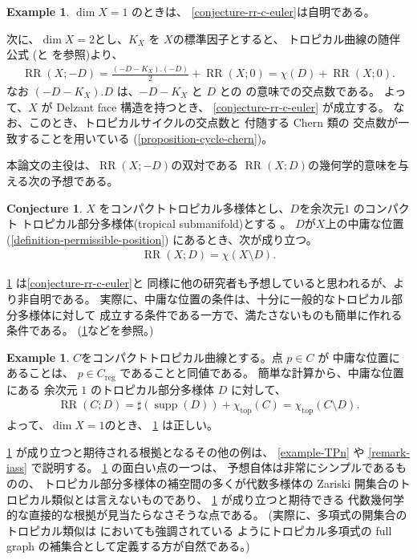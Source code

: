 \documentclass[a4paper,dvipdfmx,reqno,12pt]{amsart}
\theoremstyle{definition}
\newtheorem{example}[theorem]{Example}
\newtheorem{conjecture}[theorem]{Conjecture}
\newcommand{\opn}[1]{\operatorname{#1}}
\numberwithin{equation}{section}
\begin{document}
\begin{example}
$\dim X=1$ のときは、
\cref{conjecture-rr-c-euler}は自明である。

次に、$\dim X=2$とし、$K_X$ を
$X$の標準因子とすると、
トロピカル曲線の随伴公式
(\cite[Theorem 6]{shaw2015tropical}と
\cite[Theorem 5.2]{demedrano2023chern}を参照)より、
\begin{align}
\opn{RR}(X;-D)=\frac{(-D-K_X).(-D)}{2}+\opn{RR}(X;0)
=\chi(D)+\opn{RR}(X;0).
\end{align}
なお $(-D-K_X). D$ は、$-D-K_X$ と
$D$ との \cite{shaw2015tropical} の意味での交点数である。
よって、$X$ が Delzant face 構造を持つとき、
\cref{conjecture-rr-c-euler} が成立する。
なお、このとき、トロピカルサイクルの交点数と
付随する Chern 類の
交点数が一致することを用いている
(\cref{proposition-cycle-chern})。
\end{example}
本論文の主役は、$\opn{RR}(X;-D)$の双対である
$\opn{RR}(X;D)$の幾何学的意味を与える次の予想である。

\begin{conjecture}
\label{conjecture-rr-euler}
$X$ をコンパクトトロピカル多様体とし、$D$を余次元$1$
のコンパクト
トロピカル部分多様体(tropical submanifold)とする
\cite[Definition 2.14]{demedrano2023chern}。
$D$が$X$上の中庸な位置
(\cref{definition-permissible-position})
にあるとき、次が成り立つ。
\begin{align}
\opn{RR}(X;D)=\chi(X\setminus D).
\end{align}
\end{conjecture}
\cref{conjecture-rr-euler}
は\cref{conjecture-rr-c-euler}と
同様に他の研究者も予想していると思われるが、より非自明である。
実際に、中庸な位置の条件は、十分に一般的なトロピカル部分多様体に対して
成立する条件である一方で、満たさないものも簡単に作れる条件である。
(\cref{example-permissible-point}などを参照。)

\begin{example}
\label{example-permissible-point}
$C$をコンパクトトロピカル曲線とする。点 $p\in C$ が
中庸な位置にあることは、
$p\in C_{\opn{reg}}$ であることと同値である。
簡単な計算から、中庸な位置にある
余次元 $1$ のトロピカル部分多様体
$D$ に対して、
\begin{align}
\opn{RR}(C;D)=\sharp (\opn{supp}(D))+ \chi_{\opn{top}}(C)
=\chi_{\opn{top}}(C\setminus D).
\end{align}
よって、$\dim X=1$のとき、
\cref{conjecture-rr-euler}
は正しい。
\end{example}

\cref{conjecture-rr-euler}
が成り立つと期待される根拠となるその他の例は、
\cref{example-TPn} や
\cref{remark-iass} で説明する。
\cref{conjecture-rr-euler} の面白い点の一つは、
予想自体は非常にシンプルであるものの、
トロピカル部分多様体の補空間の多くが代数多様体の
Zariski 開集合のトロピカル類似とは言えないものであり、
\cref{conjecture-rr-euler} が成り立つと期待できる
代数幾何学的な直接的な根拠が見当たらなさそうな点である。
(実際に、多項式の開集合のトロピカル類似は
\cite[Remark 3.5 and Example 3.6]{MR2275625} 
においても強調されている
ようにトロピカル多項式の full graph 
\cite[]{MR2275625}
の補集合として定義する方が自然である。)
\end{document}
